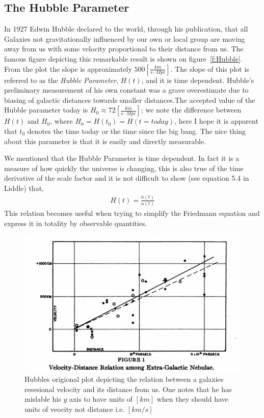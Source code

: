 \documentclass[twoside]{article}
\begin{document}
\subsection{The Hubble Parameter}
In 1927 Edwin Hubble declared to the world, through his publication,  that all Galaxies not gravitationally influenced by our own or local group are moving away from us with some velocity proportional to their distance from us. The famous figure depicting this remarkable result is shown on figure~\ref{f:Hubble}. From the plot the slope is approximately $500 [\frac{km}{s\cdot Mpc}]$.  The slope of this plot is referred to as the \emph{Hubble Parameter}, $H(t)$, and it is time dependent. Hubble's  preliminary measurement of his own constant was a grave overestimate due to biasing of galactic distances towards smaller distances.The accepted value of the Hubble parameter today is $H_{0} \approx 72 [\frac{km}{s\cdot Mpc}]$; we note the difference between $H(t)$ and $H_{0}$, where $H_{0} = H(t_{0}) = H(t=today)$, here I hope it is apparent that $t_{0}$ denotes the time today or the time since the big bang. The nice thing about this parameter is that it is easily and directly measurable.\par
We mentioned that the Hubble Parameter is time dependent. In fact it is a measure of how quickly the universe is changing, this is also true of the time derivative of the scale factor and it is not difficult to show (see equation 5.4 in Liddle) that,
\begin{align}
H(t) = \frac{\dot{a}(t)}{a(t)}
\end{align}
This relation becomes useful when trying to simplify the Friedmann equation and express it in totality by observable quantities.

\begin{figure}[h!]
  \centering
      \includegraphics[width=1\textwidth]{hubbleslaw_plot.jpg}
  \caption{Hubbles origional plot depicting the relation  between a galaxies resesional velocity and its distance from us. One notes that he has mislable his $y$ axis to have units of $[km]$ when they should have units of veocity not distance i.e. $[km/s]$ }
\end{figure} 
\end{document}
